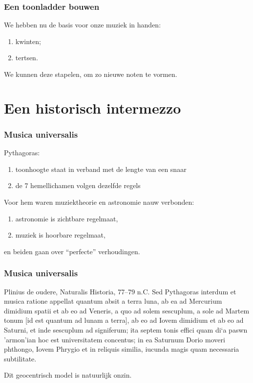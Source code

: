 \documentclass[compress, darktitle, framenumber, totalframenumber]{beamer}
\begin{document}
\begin{frame}
  \frametitle{Een toonladder bouwen}

  We hebben nu de basis voor onze muziek in handen:
  \begin{enumerate}
    \item kwinten;
    \item tertsen.
  \end{enumerate}
  We kunnen deze stapelen, om zo nieuwe noten te vormen.
\end{frame}


\section{Een historisch intermezzo}

\begin{frame}
  \frametitle{Musica universalis}

  Pythagoras:
  \begin{enumerate}
    \item toonhoogte staat in verband met de lengte van een snaar
    \item de 7 hemellichamen volgen dezelfde regels
  \end{enumerate}

  \pause
  Voor hem waren muziektheorie en astronomie nauw verbonden:
  \begin{enumerate}
    \item astronomie is \alert{zichtbare} regelmaat,
    \item muziek is \alert{hoorbare} regelmaat,
  \end{enumerate}
  en beiden gaan over \alert{``perfecte'' verhoudingen}.
\end{frame}

\begin{frame}
  \frametitle{Musica universalis}

  \begin{block}{Plinius de oudere, Naturalis Historia, 77--79 n.C.}
    Sed Pythagoras interdum et musica ratione appellat quantum absit a terra luna, ab ea ad Mercurium dimidium spatii et ab eo ad Veneris, a quo ad solem sescuplum, a sole ad Martem tonum [id est quantum ad lunam a terra], ab eo ad Iovem dimidium et ab eo ad Saturni, et inde sescuplum ad signiferum; ita septem tonis effici quam \greektext di`a paswn 'armon'ian \latintext hoc est universitatem concentus; in ea Saturnum Dorio moveri phthongo, Iovem Phrygio et in reliquis similia, iucunda magis quam necessaria subtilitate.
  \end{block}

  \pause

  Dit \alert{geocentrisch model} is natuurlijk onzin.
\end{frame}
\end{document}
